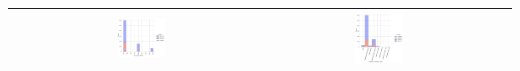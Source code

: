 \begin{table}[!htb]
\begin{center}
\begin{tabular}{ |c|c|c|c| }
         & \includegraphics[width=0.21\textwidth]{NOTEBOOK/IMAGENES_BIRCH_DESCRIPTIVAS/15} 
         & \includegraphics[width=0.21\textwidth]{NOTEBOOK/IMAGENES_BIRCH_DESCRIPTIVAS/16} 
         \\  \hline    
		\end{tabular} 
	\end{center} 
\end{table}

